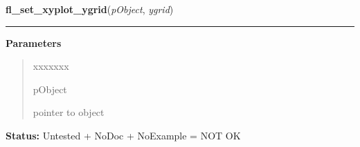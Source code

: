     \label{xformslib:library:fl_set_xyplot_ygrid}

    \vspace{0.5ex}

\hspace{.8\funcindent}\begin{boxedminipage}{\funcwidth}

    \raggedright \textbf{fl\_set\_xyplot\_ygrid}(\textit{pObject}, \textit{ygrid})

    \vspace{-1.5ex}

    \rule{\textwidth}{0.5\fboxrule}
\setlength{\parskip}{2ex}
\setlength{\parskip}{1ex}
      \textbf{Parameters}
      \vspace{-1ex}

      \begin{quote}
        \begin{Ventry}{xxxxxxx}

          \item[pObject]

          pointer to object

        \end{Ventry}

      \end{quote}

\textbf{Status:} Untested + NoDoc + NoExample = NOT OK



    \end{boxedminipage}

    \label{xformslib:library:fl_set_xyplot_grid_linestyle}

    \vspace{0.5ex}

